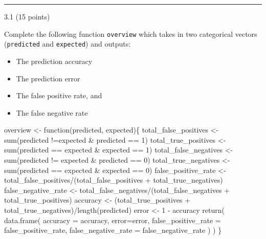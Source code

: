 \documentclass[
  letterpaper,
  DIV=11,
  numbers=noendperiod]{scrartcl}
\newenvironment{Shaded}{\begin{snugshade}}{\end{snugshade}}
\newcommand{\AttributeTok}[1]{\textcolor[rgb]{0.40,0.45,0.13}{#1}}
\newcommand{\ControlFlowTok}[1]{\textcolor[rgb]{0.00,0.23,0.31}{#1}}
\newcommand{\DecValTok}[1]{\textcolor[rgb]{0.68,0.00,0.00}{#1}}
\newcommand{\FunctionTok}[1]{\textcolor[rgb]{0.28,0.35,0.67}{#1}}
\newcommand{\NormalTok}[1]{\textcolor[rgb]{0.00,0.23,0.31}{#1}}
\newcommand{\OtherTok}[1]{\textcolor[rgb]{0.00,0.23,0.31}{#1}}
\newcommand{\SpecialCharTok}[1]{\textcolor[rgb]{0.37,0.37,0.37}{#1}}
\providecommand{\tightlist}{%
  \setlength{\itemsep}{0pt}\setlength{\parskip}{0pt}}\usepackage{longtable,booktabs,array}
\begin{document}
\begin{center}\rule{0.5\linewidth}{0.5pt}\end{center}

3.1 (15 points)

Complete the following function \texttt{overview} which takes in two
categorical vectors (\texttt{predicted} and \texttt{expected}) and
outputs:

\begin{itemize}
\tightlist
\item
  The prediction accuracy
\item
  The prediction error
\item
  The false positive rate, and
\item
  The false negative rate
\end{itemize}

\begin{Shaded}
\begin{Highlighting}[]
\NormalTok{overview }\OtherTok{\textless{}{-}} \ControlFlowTok{function}\NormalTok{(predicted, expected)\{}
\NormalTok{    total\_false\_positives }\OtherTok{\textless{}{-}} \FunctionTok{sum}\NormalTok{(predicted }\SpecialCharTok{!=}\NormalTok{expected }\SpecialCharTok{\&}\NormalTok{ predicted }\SpecialCharTok{==} \DecValTok{1}\NormalTok{)}
\NormalTok{    total\_true\_positives }\OtherTok{\textless{}{-}} \FunctionTok{sum}\NormalTok{(predicted }\SpecialCharTok{==}\NormalTok{ expected }\SpecialCharTok{\&}\NormalTok{ expected }\SpecialCharTok{==} \DecValTok{1}\NormalTok{)}
\NormalTok{    total\_false\_negatives }\OtherTok{\textless{}{-}} \FunctionTok{sum}\NormalTok{(predicted }\SpecialCharTok{!=}\NormalTok{ expected }\SpecialCharTok{\&}\NormalTok{ predicted }\SpecialCharTok{==} \DecValTok{0}\NormalTok{)}
\NormalTok{    total\_true\_negatives }\OtherTok{\textless{}{-}} \FunctionTok{sum}\NormalTok{(predicted }\SpecialCharTok{==}\NormalTok{ expected }\SpecialCharTok{\&}\NormalTok{ expected }\SpecialCharTok{==} \DecValTok{0}\NormalTok{)}
\NormalTok{    false\_positive\_rate }\OtherTok{\textless{}{-}}\NormalTok{ total\_false\_positives}\SpecialCharTok{/}\NormalTok{(total\_false\_positives }\SpecialCharTok{+}\NormalTok{ total\_true\_negatives)}
\NormalTok{    false\_negative\_rate }\OtherTok{\textless{}{-}}\NormalTok{ total\_false\_negatives}\SpecialCharTok{/}\NormalTok{(total\_false\_negatives }\SpecialCharTok{+}\NormalTok{ total\_true\_positives)}
\NormalTok{    accuracy }\OtherTok{\textless{}{-}}\NormalTok{ (total\_true\_positives }\SpecialCharTok{+}\NormalTok{ total\_true\_negatives)}\SpecialCharTok{/}\FunctionTok{length}\NormalTok{(predicted)}
\NormalTok{    error }\OtherTok{\textless{}{-}} \DecValTok{1} \SpecialCharTok{{-}}\NormalTok{ accuracy}
    \FunctionTok{return}\NormalTok{(}
        \FunctionTok{data.frame}\NormalTok{(}
            \AttributeTok{accuracy =}\NormalTok{ accuracy, }
            \AttributeTok{error=}\NormalTok{error, }
            \AttributeTok{false\_positive\_rate =}\NormalTok{ false\_positive\_rate, }
            \AttributeTok{false\_negative\_rate =}\NormalTok{ false\_negative\_rate}
\NormalTok{        )}
\NormalTok{    )}
\NormalTok{\}}
\end{Highlighting}
\end{Shaded}
\end{document}
